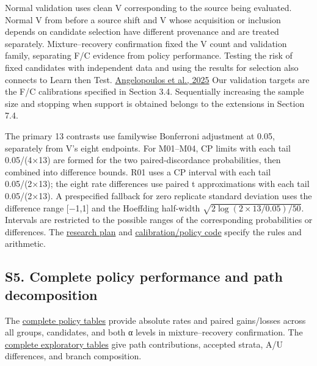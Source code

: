 \documentclass[10pt,a4paper]{article}
\begin{document}
Normal validation uses clean V corresponding to the source being evaluated. Normal V from before a source shift and V whose acquisition or inclusion depends on candidate selection have different provenance and are treated separately. Mixture–recovery confirmation fixed the V count and validation family, separating F/C evidence from policy performance. Testing the risk of fixed candidates with independent data and using the results for selection also connects to Learn then Test. \href{https://doi.org/10.1214/24-AOAS1998}{Angelopoulos et al., 2025} Our validation targets are the F/C calibrations specified in Section 3.4. Sequentially increasing the sample size and stopping when support is obtained belongs to the extensions in Section 7.4.

The primary 13 contrasts use familywise Bonferroni adjustment at 0.05, separately from V's eight endpoints. For M01–M04, CP limits with each tail 0.05/(4×13) are formed for the two paired-discordance probabilities, then combined into difference bounds. R01 uses a CP interval with each tail 0.05/(2×13); the eight rate differences use paired t approximations with each tail 0.05/(2×13). A prespecified fallback for zero replicate standard deviation uses the difference range [−1,1] and the Hoeffding half-width \(\sqrt{2\log(2\times13/0.05)/50}\). Intervals are restricted to the possible ranges of the corresponding probabilities or differences. The \href{https://github.com/metaSATOKEN/First-Order-Probes/blob/789f3c83bc85511d9e7a65f083c5806f2d36e8f2/audits/prereg/PR-0012_mixture_recovery_confirmation.md}{research plan} and \href{https://github.com/metaSATOKEN/First-Order-Probes/blob/789f3c83bc85511d9e7a65f083c5806f2d36e8f2/numerics/scripts/pr0012_methods.py}{calibration/policy code} specify the rules and arithmetic.

\subsection{S5. Complete policy performance and path decomposition}

The \href{https://github.com/metaSATOKEN/First-Order-Probes/blob/789f3c83bc85511d9e7a65f083c5806f2d36e8f2/numerics/analysis/pr0012_64bf0f2c7697_confirmation_v1/ALL_POLICIES.md}{complete policy tables} provide absolute rates and paired gains/losses across all groups, candidates, and both α levels in mixture–recovery confirmation. The \href{https://github.com/metaSATOKEN/First-Order-Probes/blob/789f3c83bc85511d9e7a65f083c5806f2d36e8f2/numerics/analysis/pr0012_64bf0f2c7697_exploration_v2/ALL_EXPLORATORY_RESULTS.md}{complete exploratory tables} give path contributions, accepted strata, A/U differences, and branch composition.
\end{document}
